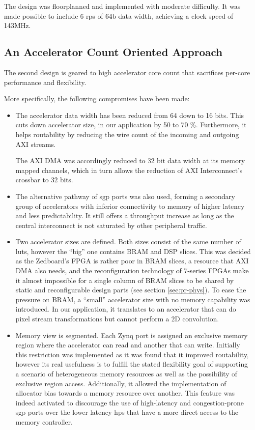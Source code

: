 The design was floorplanned and implemented with moderate difficulty.
It was made possible to include 6 \glspl{rp} of 64b data width,
achieving a clock speed of 143MHz.


\subsection{An Accelerator Count Oriented Approach}

The second design is geared to high accelerator core count 
that sacrifices per-core performance and flexibility.

More specifically, the following compromises have been made:

\begin{itemize}
\item	The accelerator data width has been reduced from 64 down to 16 bits.
	This cuts down accelerator size, in our application by 50 to 70 \%.
	Furthermore, it helps routability by reducing the wire count of the
	incoming and outgoing AXI streams. 
	
	The AXI DMA was accordingly reduced to 32 bit data width at its memory mapped channels,
	which in turn allows the reduction of AXI Interconnect's crossbar to 32 bits.

\item	The alternative pathway of \gls{sgp} ports was also used, forming a secondary
	group of accelerators with inferior connectivity to memory of higher latency
	and less predictability. 
	It still offers a throughput increase as long as the central interconnect is not
	saturated by other peripheral traffic.

\item	Two accelerator sizes are defined. 
	Both sizes consist of the same number of \glspl{lut},
	however the ``big'' one contains BRAM and DSP slices. This was decided as the
	Zedboard's FPGA is rather poor in BRAM slices, a resource that AXI DMA also needs,
	and the reconfiguration technology of 7-series FPGAs make it almost impossible
	for a single column of BRAM slices to be shared by static and reconfigurable 
	design parts (see section \ref{sec:pr-phys}).
	To ease the pressure on BRAM, a ``small'' accelerator size with no memory capability was
	introduced. In our application, it translates to an accelerator that can do
	pixel stream transformations but cannot perform a 2D convolution.

\item	Memory view is segmented. Each Zynq port is assigned an exclusive memory region
	where the accelerator can read and another that can write. 
	Initially this restriction was implemented as it was found that it improved routability,
	however its real usefulness is to fulfill the stated flexibility goal of supporting
	a scenario of heterogeneous memory resources as well as the possibility of exclusive region access.
	Additionally, it allowed the implementation of allocator bias towards a memory resource over another.
	This feature was indeed activated to discourage the use of high-latency and 
	congestion-prone \gls{sgp} ports over the lower latency \glspl{hp} that have a more direct access
	to the memory controller.
\end{itemize}

